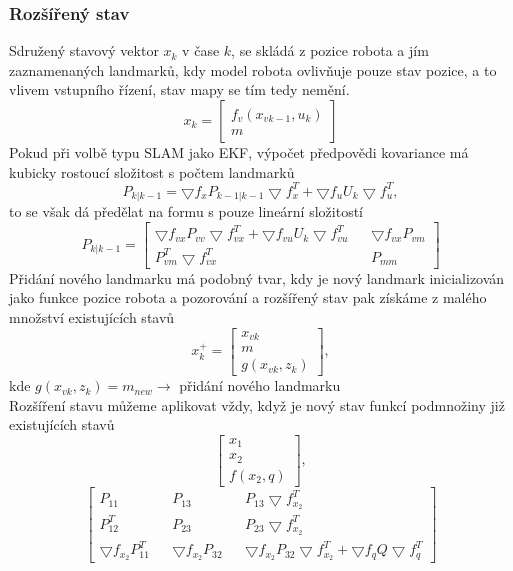 \documentclass[11pt]{article}
\begin{document}
\subsubsection{Rozšířený stav}
Sdružený stavový vektor $x_k$ v čase $k$, se skládá z pozice robota a jím zaznamenaných landmarků, kdy model robota ovlivňuje pouze stav pozice, a to vlivem vstupního řízení, stav mapy se tím tedy nemění. 
$$x_k=\begin{bmatrix}
f_v(x_{vk-1},u_k)\\m
\end{bmatrix} $$
Pokud při volbě typu SLAM jako EKF, výpočet předpovědi kovariance má kubicky rostoucí složitost s počtem landmarků
$$P_{k|k-1}=\bigtriangledown f_xP_{k-1|k-1}\bigtriangledown f^T_x+\bigtriangledown f_uU_k\bigtriangledown f^T_u,$$
to se však dá předělat na formu s pouze lineární složitostí
$$P_{k|k-1}=\begin{bmatrix}
\bigtriangledown f_{vx}P_{vv}\bigtriangledown f^T_{vx}+\bigtriangledown f_{vu}U_k\bigtriangledown f^T_{vu}&&\bigtriangledown f_{vx}P_{vm}\\
P^T_{vm}\bigtriangledown f^T_{vx}&&P_{mm}
\end{bmatrix} $$
Přidání nového landmarku má podobný tvar, kdy je nový landmark inicializován jako funkce pozice robota a pozorování a rozšířený stav pak získáme z malého množství existujících stavů 
$$x^+_k=\begin{bmatrix}
x_{vk}\\m\\g(x_{vk},z_k)
\end{bmatrix},$$
kde $g(x_{vk},z_k)=m_{new}\rightarrow$ přidání nového landmarku \\
Rozšíření stavu můžeme aplikovat vždy, když je nový stav funkcí podmnožiny již existujících stavů
$$\begin{bmatrix}
x_1\\x_2\\f(x_2,q)
\end{bmatrix}, $$
$$
\begin{bmatrix}
P_{11}&&P_{13}&&P_{13}\bigtriangledown f^T_{x_2}\\
P^T_{12}&&P_{23}&&P_{23}\bigtriangledown f^T_{x_2}\\
\bigtriangledown f_{x_2}P^T_{11}&&\bigtriangledown f_{x_2}P_{32}&&\bigtriangledown f_{x_2}P_{32}\bigtriangledown f^T_{x_2}+\bigtriangledown f_qQ\bigtriangledown f^T_q
\end{bmatrix}
$$
\end{document}
